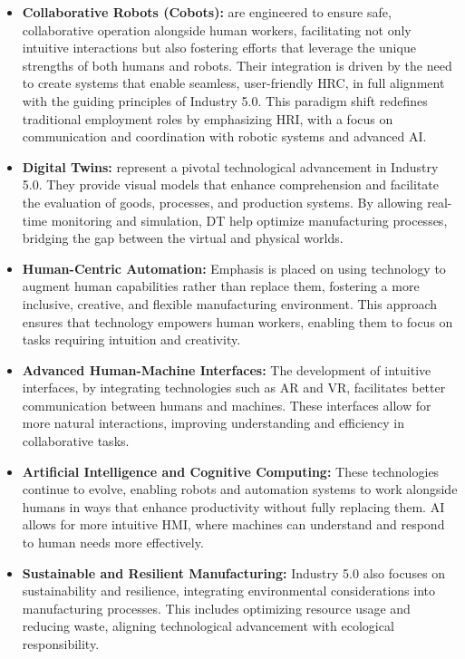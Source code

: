 \begin{itemize}
    \item \textbf{Collaborative Robots (Cobots):} are engineered to ensure safe, collaborative operation alongside human workers, facilitating not only intuitive interactions but also fostering efforts that leverage the unique strengths of both humans and robots. Their integration is driven by the need to create systems that enable seamless, user-friendly \ac{HRC}, in full alignment with the guiding principles of Industry 5.0. This paradigm shift redefines traditional employment roles by emphasizing \ac{HRI}, with a focus on communication and coordination with robotic systems and advanced \ac{AI}.

    \item \textbf{Digital Twins:} represent a pivotal technological advancement in Industry 5.0. They provide visual models that enhance comprehension and facilitate the evaluation of goods, processes, and production systems. By allowing real-time monitoring and simulation, \ac{DT} help optimize manufacturing processes, bridging the gap between the virtual and physical worlds.

    \item \textbf{Human-Centric Automation:} Emphasis is placed on using technology to augment human capabilities rather than replace them, fostering a more inclusive, creative, and flexible manufacturing environment. This approach ensures that technology empowers human workers, enabling them to focus on tasks requiring intuition and creativity.

    \item \textbf{Advanced Human-Machine Interfaces:} The development of intuitive interfaces, by integrating technologies such as \ac{AR} and \ac{VR}, facilitates better communication between humans and machines. These interfaces allow for more natural interactions, improving understanding and efficiency in collaborative tasks.

    \item \textbf{Artificial Intelligence and Cognitive Computing:} These technologies continue to evolve, enabling robots and automation systems to work alongside humans in ways that enhance productivity without fully replacing them. \ac{AI} allows for more intuitive \ac{HMI}, where machines can understand and respond to human needs more effectively.

    \item \textbf{Sustainable and Resilient Manufacturing:} Industry 5.0 also focuses on sustainability and resilience, integrating environmental considerations into manufacturing processes. This includes optimizing resource usage and reducing waste, aligning technological advancement with ecological responsibility.
\end{itemize}


